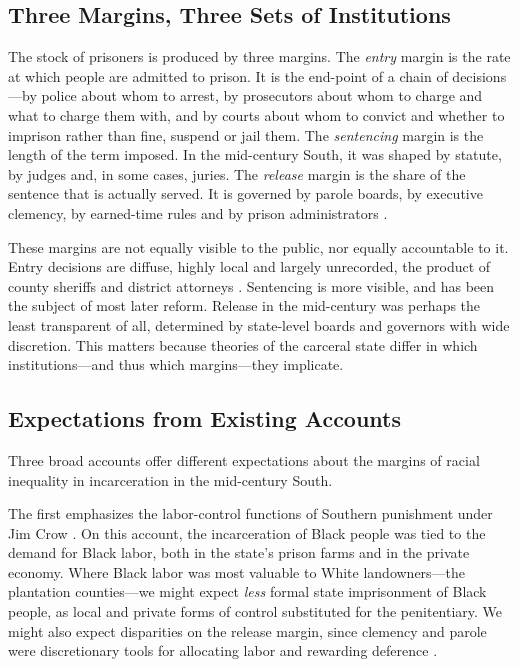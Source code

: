 \documentclass[12pt]{article}
\begin{document}
\subsection*{Three Margins, Three Sets of Institutions}

\noindent The stock of prisoners is produced by three margins.  The \emph{entry} margin is the rate at which people are admitted to prison.  It is the end-point of a chain of decisions---by police about whom to arrest, by prosecutors about whom to charge and what to charge them with, and by courts about whom to convict and whether to imprison rather than fine, suspend or jail them.  The \emph{sentencing} margin is the length of the term imposed.  In the mid-century South, it was shaped by statute, by judges and, in some cases, juries.  The \emph{release} margin is the share of the sentence that is actually served.  It is governed by parole boards, by executive clemency, by earned-time rules and by prison administrators \citep{Oshinsky:1997up,Campbell:2013tw}.

These margins are not equally visible to the public, nor equally accountable to it.  Entry decisions are diffuse, highly local and largely unrecorded, the product of county sheriffs and district attorneys \citep{Pfaff:2017tp}.  Sentencing is more visible, and has been the subject of most later reform.  Release in the mid-century was perhaps the least transparent of all, determined by state-level boards and governors with wide discretion.  This matters because theories of the carceral state differ in which institutions---and thus which margins---they implicate.

\subsection*{Expectations from Existing Accounts}

\noindent Three broad accounts offer different expectations about the margins of racial inequality in incarceration in the mid-century South.

The first emphasizes the labor-control functions of Southern punishment under Jim Crow \citep{Lichtenstein:1996ug,Oshinsky:1997up,Blackmon:2009wo,LeFlouria:2015vj,Muller:2019uv}.  On this account, the incarceration of Black people was tied to the demand for Black labor, both in the state's prison farms and in the private economy.  Where Black labor was most valuable to White landowners---the plantation counties---we might expect \emph{less} formal state imprisonment of Black people, as local and private forms of control substituted for the penitentiary.  We might also expect disparities on the release margin, since clemency and parole were discretionary tools for allocating labor and rewarding deference \citep{Oshinsky:1997up}.
\end{document}

